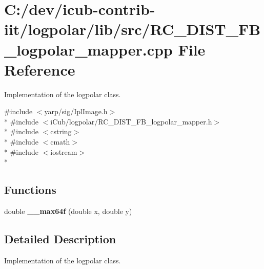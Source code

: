 \section{C\+:/dev/icub-\/contrib-\/iit/logpolar/lib/src/\+R\+C\+\_\+\+D\+I\+S\+T\+\_\+\+F\+B\+\_\+logpolar\+\_\+mapper.cpp File Reference}
\label{RC__DIST__FB__logpolar__mapper_8cpp}


Implementation of the logpolar class.  


{\ttfamily \#include $<$yarp/sig/\+Ipl\+Image.\+h$>$}\\*
{\ttfamily \#include $<$i\+Cub/logpolar/\+R\+C\+\_\+\+D\+I\+S\+T\+\_\+\+F\+B\+\_\+logpolar\+\_\+mapper.\+h$>$}\\*
{\ttfamily \#include $<$cstring$>$}\\*
{\ttfamily \#include $<$cmath$>$}\\*
{\ttfamily \#include $<$iostream$>$}\\*
\subsection*{Functions}
\begin{DoxyCompactItemize}
\item 
double {\bfseries \+\_\+\+\_\+max64f} (double x, double y)\label{RC__DIST__FB__logpolar__mapper_8cpp_ae9d9e86bf042ca5fdba4f9a6c8c54a42}

\end{DoxyCompactItemize}


\subsection{Detailed Description}
Implementation of the logpolar class. 

